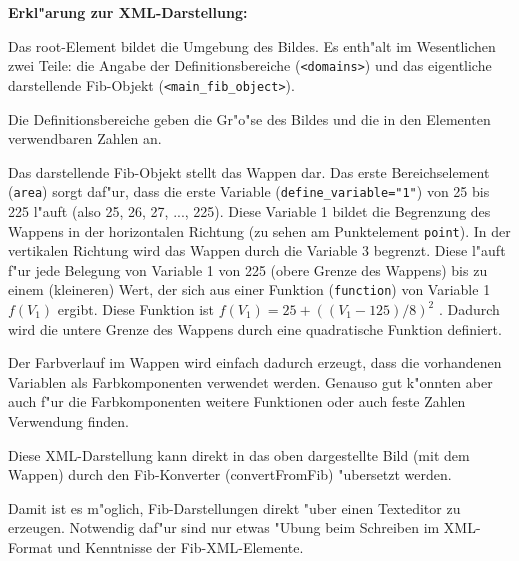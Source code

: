\documentclass[12pt,a4paper]{article}
\begin{document}
\bigskip\noindent
\textbf{Erkl"arung zur XML-Darstellung:}

Das root-Element bildet die Umgebung des Bildes. Es enth"alt im Wesentlichen zwei Teile: die Angabe der Definitionsbereiche (\verb|<domains>|) und das eigentliche darstellende Fib-Objekt (\verb|<main_fib_object>|).

Die Definitionsbereiche geben die Gr"o"se des Bildes und die in den Elementen verwendbaren Zahlen an.

Das darstellende Fib-Objekt stellt das Wappen dar.
Das erste Bereichselement (\verb|area|) sorgt daf"ur, dass die erste Variable (\verb|define_variable="1"|) von 25 bis 225 l"auft (also 25, 26, 27, ..., 225). Diese Variable 1 bildet die Begrenzung des Wappens in der horizontalen Richtung (zu sehen am Punktelement \verb|point|).
In der vertikalen Richtung wird das Wappen durch die Variable 3 begrenzt. Diese l"auft f"ur jede Belegung von Variable 1 von 225 (obere Grenze des Wappens) bis zu einem (kleineren) Wert, der sich aus einer Funktion (\verb|function|) von Variable 1 $f(V_1)$ ergibt. Diese Funktion ist $f(V_1)=25 + ( (V_1 - 125) / 8 ) ^{2}$ . Dadurch wird die untere Grenze des Wappens durch eine quadratische Funktion definiert.

Der Farbverlauf im Wappen wird einfach dadurch erzeugt, dass die vorhandenen Variablen als Farbkomponenten verwendet werden. Genauso gut k"onnten aber auch f"ur die Farbkomponenten weitere Funktionen oder auch feste Zahlen Verwendung finden.

\bigskip
Diese XML-Darstellung kann direkt in das oben dargestellte Bild (mit dem Wappen) durch den Fib-Konverter (convertFromFib) "ubersetzt werden.

Damit ist es m"oglich, Fib-Darstellungen direkt "uber einen Texteditor zu erzeugen. Notwendig daf"ur sind nur etwas "Ubung beim Schreiben im XML-Format und Kenntnisse der Fib-XML-Elemente.
\end{document}
